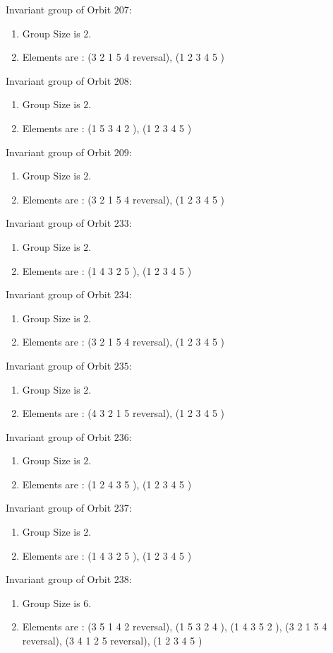 \documentclass[12pt]{article}
\begin{document}
Invariant group of Orbit $207$:
\begin{enumerate}
\item Group Size is $2$.
\item Elements are : (3 2 1 5 4   reversal), (1 2 3 4 5  )
\end{enumerate}
Invariant group of Orbit $208$:
\begin{enumerate}
\item Group Size is $2$.
\item Elements are : (1 5 3 4 2  ), (1 2 3 4 5  )
\end{enumerate}
Invariant group of Orbit $209$:
\begin{enumerate}
\item Group Size is $2$.
\item Elements are : (3 2 1 5 4   reversal), (1 2 3 4 5  )
\end{enumerate}
Invariant group of Orbit $233$:
\begin{enumerate}
\item Group Size is $2$.
\item Elements are : (1 4 3 2 5  ), (1 2 3 4 5  )
\end{enumerate}
Invariant group of Orbit $234$:
\begin{enumerate}
\item Group Size is $2$.
\item Elements are : (3 2 1 5 4   reversal), (1 2 3 4 5  )
\end{enumerate}
Invariant group of Orbit $235$:
\begin{enumerate}
\item Group Size is $2$.
\item Elements are : (4 3 2 1 5   reversal), (1 2 3 4 5  )
\end{enumerate}
Invariant group of Orbit $236$:
\begin{enumerate}
\item Group Size is $2$.
\item Elements are : (1 2 4 3 5  ), (1 2 3 4 5  )
\end{enumerate}
Invariant group of Orbit $237$:
\begin{enumerate}
\item Group Size is $2$.
\item Elements are : (1 4 3 2 5  ), (1 2 3 4 5  )
\end{enumerate}
Invariant group of Orbit $238$:
\begin{enumerate}
\item Group Size is $6$.
\item Elements are : (3 5 1 4 2   reversal), (1 5 3 2 4  ), (1 4 3 5 2  ), (3 2 1 5 4   reversal), (3 4 1 2 5   reversal), (1 2 3 4 5  )
\end{enumerate}
\end{document}

